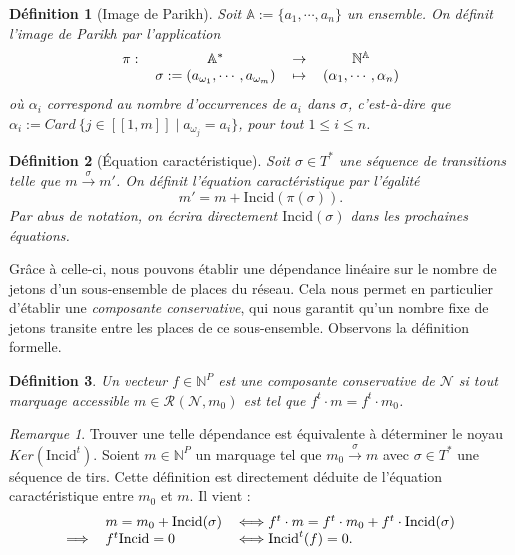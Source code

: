 \documentclass{article}
\newtheorem{definition}{Définition}
\theoremstyle{remark}
\newtheorem*{remark}{Remarque}
\theoremstyle{remark}
\newcommand{\reach}[3][]{\mathcal{R}^{#1}(\mathcal{#2}, #3)}
\newcommand{\reaches}[1][]{\xrightarrow{#1}}
\newcommand{\function}[5]{
    \begin{tabular}{r c c c}
         $#1 :$ & $#2$ & $\rightarrow$ & $#3$ \\
                & $#4$ &   $\mapsto$   & $#5$
    \end{tabular}
}
\newcommand{\incid}{\mathrm{Incid}}
\begin{document}
\begin{definition}[Image de Parikh]
    Soit $\mathbb{A} := \{a_1, \cdots, a_n\}$ un ensemble. On définit l'image de Parikh par l'application
    \[\function{\pi}{\mathbb{A}^*}{\mathbb{N}^{\mathbb{A}}}{\sigma := (a_{\omega_1}, \cdots, a_{\omega_m})}{(\alpha_1, \cdots, \alpha_n)}\]
    où $\alpha_i$ correspond au nombre d'occurrences de $a_i$ dans $\sigma$, c'est-à-dire que $\alpha_i := Card\ \{j \in [\![1, m]\!] \mid a_{\omega_j} = a_i\}$, pour tout $1 \leq i \leq n$.
\end{definition}

\begin{definition}[Équation caractéristique]
    Soit $\sigma \in T^*$ une séquence de transitions telle que $m \reaches[\sigma] m'$. On définit l'équation caractéristique par l'égalité \[m' = m + \incid(\pi(\sigma)).\] Par abus de notation, on écrira directement $\incid(\sigma)$ dans les prochaines équations.
\end{definition}

Grâce à celle-ci, nous pouvons établir une dépendance linéaire sur le nombre de jetons d'un sous-ensemble de places du réseau. Cela nous permet en particulier d'établir une \textit{composante conservative}, qui nous garantit qu'un nombre fixe de jetons transite entre les places de ce sous-ensemble. Observons la définition formelle.

\begin{definition}
    Un vecteur $f \in \mathbb{N}^P$ est une composante conservative de $\mathcal{N}$ si tout marquage accessible $m \in \reach{N}{m_0}$ est tel que $f^t \cdot m = f^t \cdot m_0$.
\end{definition}

\begin{remark}
    Trouver une telle dépendance est équivalente à déterminer le noyau $Ker(\incid^t)$. Soient $m \in \mathbb{N}^P$ un marquage tel que $m_0 \reaches[\sigma] m$ avec $\sigma \in T^*$ une séquence de tirs. Cette définition est directement déduite de l'équation caractéristique entre $m_0$ et $m$. Il vient : \[\begin{tabular}{r l l}
                          & $m = m_0 + \incid(\sigma)$ & $\Longleftrightarrow f^t \cdot m = f^t \cdot m_0 + f^t \cdot \incid(\sigma)$ \\
        $\Longrightarrow$ & $f^t \incid = 0$           & $\Longleftrightarrow \incid^t(f) = 0$.
    \end{tabular}\]
\end{remark}
\end{document}
